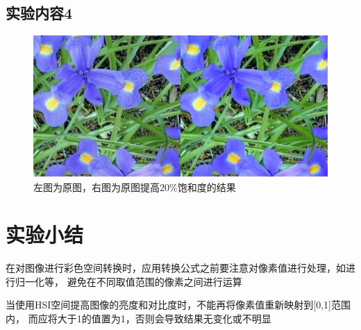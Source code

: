 \documentclass[a4paper]{ctexart}
\begin{document}
  \subsection*{实验内容4}
  \begin{figure}[H]
    \centering
      \includegraphics*[width=1\textwidth]{fig/sat20.png}
      \caption{左图为原图，右图为原图提高20\%饱和度的结果}
  \end{figure}

  \section{实验小结}
  在对图像进行彩色空间转换时，应用转换公式之前要注意对像素值进行处理，如进行归一化等，
  避免在不同取值范围的像素之间进行运算

  当使用HSI空间提高图像的亮度和对比度时，不能再将像素值重新映射到[0,1]范围内，
  而应将大于1的值置为1，否则会导致结果无变化或不明显
\end{document}
